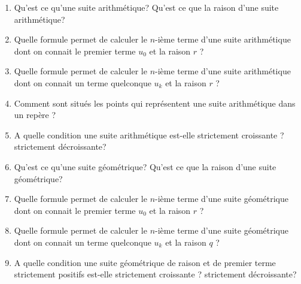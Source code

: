 
%
\begin{enumerate}
     \item
     Qu'est ce qu'une suite arithmétique? Qu'est ce que la raison d'une suite arithmétique?
     \item
     Quelle formule permet de calculer le $n$-ième terme d'une suite arithmétique dont on connait le premier terme $u_{0}$ et la raison $r$ ?
     \item
     Quelle formule permet de calculer le $n$-ième terme d'une suite arithmétique dont on connait un terme quelconque $u_{k}$ et la raison $r$ ?
     \item
     Comment sont situés les points qui représentent une suite arithmétique dans un repère ?
     \item
     A quelle condition une suite arithmétique est-elle strictement croissante ? strictement décroissante?
     \item
     Qu'est ce qu'une suite géométrique? Qu'est ce que la raison d'une suite géométrique?
     \item
     Quelle formule permet de calculer le $n$-ième terme d'une suite géométrique dont on connait le premier terme $u_{0}$ et la raison $r$ ?
     \item
     Quelle formule permet de calculer le $n$-ième terme d'une suite géométrique dont on connait un terme quelconque $u_{k}$ et la raison $q$ ?
     \item
     A quelle condition une suite géométrique de raison et de premier terme strictement positifs est-elle strictement croissante ? strictement décroissante?
\end{enumerate}
